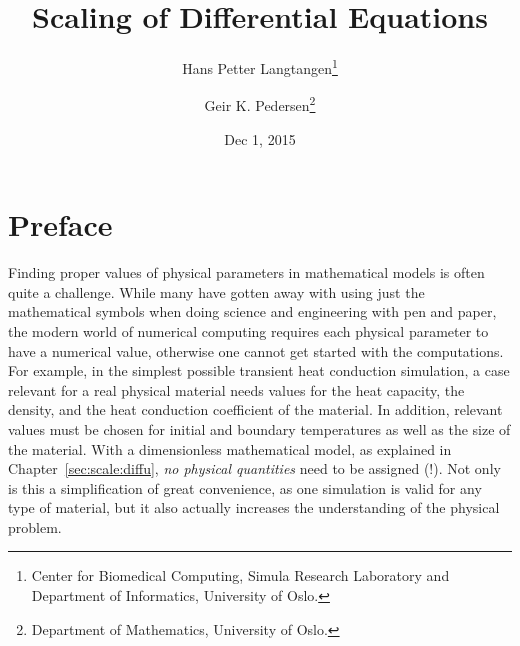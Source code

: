 \documentclass[graybox,envcountchap,sectrefs,final]{svmonodo}
\begin{document}







\frontmatter
\setcounter{page}{3}
\pagestyle{headings}



\title{Scaling of Differential Equations}


\author{Hans Petter Langtangen\footnote{Center for Biomedical Computing, Simula Research Laboratory and Department of Informatics, University of Oslo.}
\and Geir K. Pedersen\footnote{Department of Mathematics, University of Oslo.}}


\date{Dec 1, 2015}
\maketitle


\chapter*{Preface}
\label{ch:preface}

Finding proper values of physical parameters in mathematical models is
often quite a challenge. While many have gotten away with using just
the mathematical symbols when doing science and engineering with pen
and paper, the modern world of numerical computing requires each
physical parameter to have a numerical value, otherwise one cannot get
started with the computations.  For example, in the simplest possible
transient heat conduction simulation, a case relevant for a real
physical material needs values for the heat capacity, the density, and
the heat conduction coefficient of the material. In addition, relevant
values must be chosen for initial and boundary temperatures as well as
the size of the material.  With a dimensionless mathematical model, as
explained in Chapter~\ref{sec:scale:diffu}, \emph{no physical quantities}
need to be assigned (!). Not only is this a simplification of great
convenience, as one simulation is valid for any type of material, but
it also actually increases the understanding of the physical problem.
\end{document}
